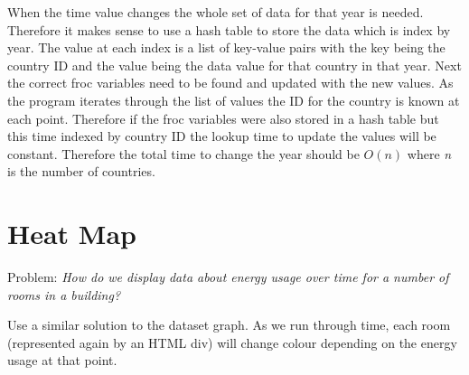 When the time value changes the whole set of data for that year is needed. Therefore it makes sense to use a hash table to store the data which is index by year. The value at each index is a list of key-value pairs with the key being the country ID and the value being the data value for that country in that year. Next the correct froc variables need to be found and updated with the new values. As the program iterates through the list of values the ID for the country is known at each point. Therefore if the froc variables were also stored in a hash table but this time indexed by country ID the lookup time to update the values will be constant. Therefore the total time to change the year should be \texttt{$O(n)$} where \emph{n} is the number of countries. 

\section{Heat Map}
Problem: \emph{How do we display data about energy usage over time for a number of rooms in a building?}

Use a similar solution to the dataset graph. As we run through time, each room (represented again by an HTML div) will change colour depending on the energy usage at that point.
